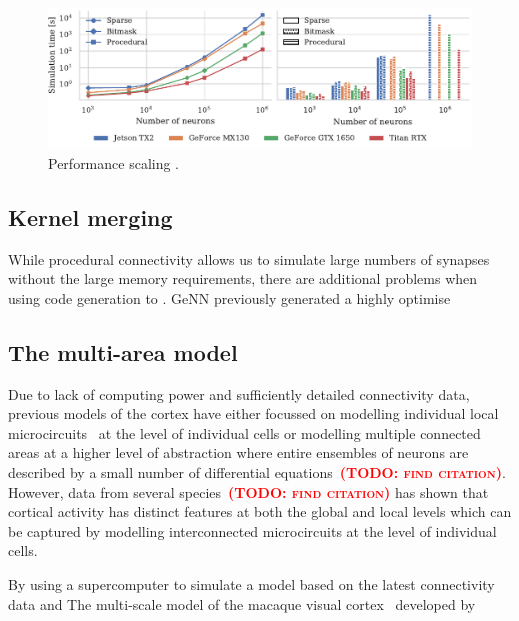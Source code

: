 \documentclass[9pt,twocolumn,twoside,lineno]{pnas-new}
\newcommand{\todo}[1]{\textbf{\textsc{\textcolor{red}{(TODO: #1)}}}}
\begin{document}
\begin{figure}
     \centering
    \includegraphics{figures/performance_scaling}
    \caption{Performance scaling .}
    \label{fig:performance_scaling}
\end{figure}


\subsection*{Kernel merging}
While procedural connectivity allows us to simulate large numbers of synapses without the large memory requirements, there are additional problems when using code generation to .
GeNN previously generated a highly optimise

\subsection*{The multi-area model}
Due to lack of computing power and sufficiently detailed connectivity data, previous models of the cortex have either focussed on modelling individual local microcircuits~\citep{Izhikevich2008,Potjans2012} at the level of individual cells or modelling multiple connected areas at a higher level of abstraction where entire ensembles of neurons are described by a small number of differential equations~\todo{find citation}.
However, data from several species~\todo{find citation} has shown that cortical activity has distinct features at both the global and local levels which can be captured by modelling interconnected microcircuits at the level of individual cells.

By using a supercomputer to simulate a model based on the latest connectivity data and The multi-scale model of the macaque visual cortex~\citep{Schmidt2018} developed by 
\end{document}
